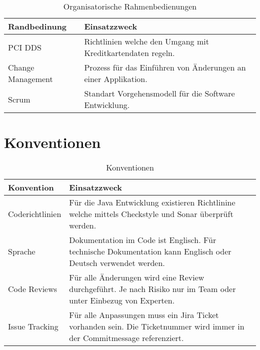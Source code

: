 \begin{table}[H]
	\centering
	\caption{Organisatorische Rahmenbedienungen}
	\begin{tabular}{ | p{4cm} | p{11cm} | }
		\toprule
		{\textbf{Randbedinung}} & {\textbf{Einsatzzweck}} \\
		\midrule
		PCI DDS & Richtlinien welche den Umgang mit Kreditkartendaten regeln. \\ \hline
		Change Management & Prozess für das Einführen von Änderungen an einer Applikation.\\ \hline
		Scrum & Standart Vorgehensmodell für die Software Entwicklung.\\ 
		\bottomrule
	\end{tabular}
\end{table}

\section{Konventionen}

\begin{table}[H]
	\centering
	\caption{Konventionen}
	\begin{tabular}{ | p{4cm} | p{11cm} | }
		\toprule
		{\textbf{Konvention}} & {\textbf{Einsatzzweck}} \\
		\midrule
		Coderichtlinien & Für die Java Entwicklung existieren Richtlinine welche mittels Checkstyle und Sonar überprüft werden. \\ \hline
		Sprache & Dokumentation im Code ist Englisch. Für technische Dokumentation kann Englisch oder Deutsch verwendet werden.\\ \hline
		Code Reviews & Für alle  Änderungen wird eine Review durchgeführt. Je nach Risiko nur im Team oder unter Einbezug von Experten.\\ \hline
		Issue Tracking & Für alle Anpassungen muss ein Jira Ticket vorhanden sein. Die Ticketnummer wird  immer in der Commitmessage referenziert.\\	
		\bottomrule
	\end{tabular}
\end{table}